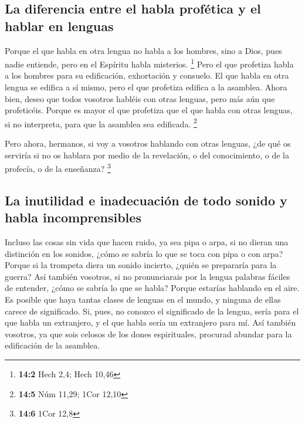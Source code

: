 \begin{paracol}{2}
\hypertarget{la-diferencia-entre-el-habla-profuxe9tica-y-el-hablar-en-lenguas}{%
\subsection{La diferencia entre el habla profética y el hablar en
lenguas}\label{la-diferencia-entre-el-habla-profuxe9tica-y-el-hablar-en-lenguas}}

 Porque el que habla en otra lengua no habla a los
hombres, sino a Dios, pues nadie entiende, pero en el Espíritu habla
misterios. \footnote{\textbf{14:2} Hech 2,4; Hech 10,46} 
Pero el que profetiza habla a los hombres para su edificación,
exhortación y consuelo.  El que habla en otra lengua se
edifica a sí mismo, pero el que profetiza edifica a la asamblea.
 Ahora bien, deseo que todos vosotros habléis con otras
lenguas, pero más aún que profeticéis. Porque es mayor el que profetiza
que el que habla con otras lenguas, si no interpreta, para que la
asamblea sea edificada. \footnote{\textbf{14:5} Núm 11,29; 1Cor 12,10}

 Pero ahora, hermanos, si voy a vosotros hablando con
otras lenguas, ¿de qué os serviría si no os hablara por medio de la
revelación, o del conocimiento, o de la profecía, o de la enseñanza?
\footnote{\textbf{14:6} 1Cor 12,8}

\hypertarget{la-inutilidad-e-inadecuaciuxf3n-de-todo-sonido-y-habla-incomprensibles}{%
\subsection{La inutilidad e inadecuación de todo sonido y habla
incomprensibles}\label{la-inutilidad-e-inadecuaciuxf3n-de-todo-sonido-y-habla-incomprensibles}}

 Incluso las cosas sin vida que hacen ruido, ya sea pipa o
arpa, si no dieran una distinción en los sonidos, ¿cómo se sabría lo que
se toca con pipa o con arpa?  Porque si la trompeta diera
un sonido incierto, ¿quién se prepararía para la guerra? 
Así también vosotros, si no pronunciarais por la lengua palabras fáciles
de entender, ¿cómo se sabría lo que se habla? Porque estarías hablando
en el aire.  Es posible que haya tantas clases de lenguas
en el mundo, y ninguna de ellas carece de significado. 
Si, pues, no conozco el significado de la lengua, sería para el que
habla un extranjero, y el que habla sería un extranjero para mí.
 Así también vosotros, ya que sois celosos de los dones
espirituales, procurad abundar para la edificación de la asamblea.


\end{paracol}
